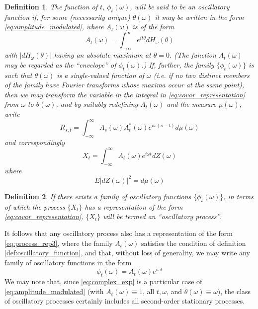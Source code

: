 \documentclass{article}
\newtheorem{definition}{Definition}
\begin{document}
\begin{definition}
  \label{def:oscillatory_function}The function of $t$, $\phi_t (\omega)$, will
  be said to be an oscillatory function if, for some (necessarily unique)
  $\theta (\omega)$ it may be written in the form
  \eqref{eq:amplitude_modulated}, where $A_t (\omega)$ is of the form
  \begin{equation}
    \label{eq:modulating_function} A_t (\omega) = \int_{- \infty}^{\infty}
    e^{it \theta} dH_{\omega} (\theta)
  \end{equation}
  with $|dH_{\omega} (\theta) |$ having an absolute maximum at $\theta = 0$.
  (The function $A_t (\omega)$ may be regarded as the ``envelope'' of $\phi_t
  (\omega)$.) If, further, the family $\{\phi_t (\omega)\}$ is such that
  $\theta (\omega)$ is a single-valued function of $\omega$ (i.e. if no two
  distinct members of the family have Fourier transforms whose maxima occur at
  the same point), then we may transform the variable in the integral in
  \eqref{eq:covar_representation} from $\omega$ to $\theta (\omega)$, and by
  suitably redefining $A_t (\omega)$ and the measure $\mu (\omega)$, write
  \begin{equation}
    \label{eq:covar_representation2} R_{s, t} = \int_{- \infty}^{\infty} A_s
    (\omega) A_t^{\ast} (\omega) e^{i \omega (s - t)} d \mu (\omega)
  \end{equation}
  and correspondingly
  \begin{equation}
    \label{eq:process_rep3} X_t = \int_{- \infty}^{\infty} A_t (\omega) e^{i
    \omega t} dZ (\omega)
  \end{equation}
  where
  \begin{equation}
    E |dZ (\omega) |^2 = d \mu (\omega)
  \end{equation}
\end{definition}

\begin{definition}
  \label{def:oscillatory_process}If there exists a family of oscillatory
  functions $\{\phi_t (\omega)\}$, in terms of which the process $\{X_t \}$
  has a representation of the form \eqref{eq:covar_representation}, $\{X_t \}$
  will be termed an ``oscillatory process''.
\end{definition}

It follows that any oscillatory process also has a representation of the form
\eqref{eq:process_rep3}, where the family $A_t (\omega)$ satisfies the
condition of definition \eqref{def:oscillatory_function}, and that, without
loss of generality, we may write any family of oscillatory functions in the
form
\begin{equation}
  \label{eq:oscillatory_functions} \phi_t (\omega) = A_t (\omega) e^{i \omega
  t}
\end{equation}
We may note that, since \eqref{eq:complex_exp} is a particular case of
\eqref{eq:amplitude_modulated} (with $A_t (\omega) \equiv 1$, all $t, \omega$,
and $\theta (\omega) \equiv \omega$), the class of oscillatory processes
certainly includes all second-order stationary processes.
\end{document}
